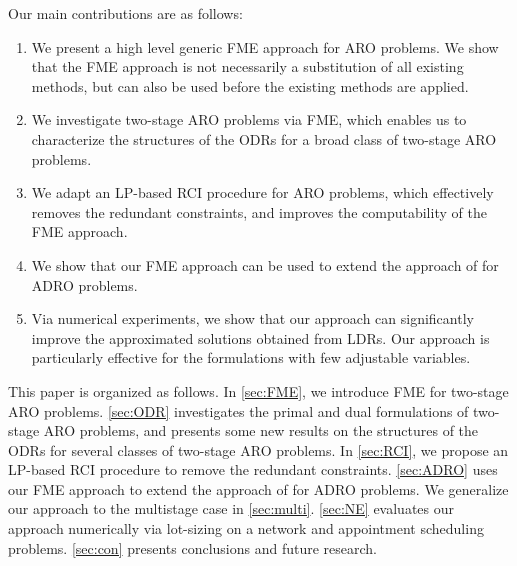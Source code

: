 \documentclass[fleqn,mnsc,blindrev]{informs4}
\begin{document}
	Our main contributions are as follows:
	\begin{enumerate}
		\item  We present a high level generic FME approach for ARO problems.  {We show that the FME approach is not necessarily a substitution of all existing methods, but can also be used before the existing methods are applied.}
		\item  We investigate two-stage ARO problems via FME, which enables us to characterize the structures of the ODRs for a broad class of two-stage ARO problems. 
		\item  We adapt an LP-based RCI procedure for ARO problems, which effectively removes the redundant constraints, and improves the computability of the FME approach.
		\item  We show that our FME approach can be used to extend the approach of \cite{bsz17} for ADRO problems. 
		\item Via numerical experiments, we show that our approach can significantly improve the  {approximated solutions obtained from LDRs}. Our approach is particularly effective for the formulations with few adjustable variables.
	\end{enumerate}
	
	This paper is organized as follows. In \textsection \ref{sec:FME}, we introduce FME for two-stage ARO problems. \textsection \ref{sec:ODR} investigates the primal and dual formulations of two-stage ARO problems, and presents some new results on the structures of the ODRs for several classes of two-stage ARO problems. In \textsection \ref{sec:RCI}, we propose an LP-based RCI procedure to remove the redundant constraints.  \textsection \ref{sec:ADRO} uses our FME approach to extend the approach of \cite{bsz17} for ADRO problems. We generalize our approach to the multistage case in \textsection \ref{sec:multi}. \textsection \ref{sec:NE} evaluates our approach numerically via lot-sizing on a network and appointment scheduling problems. \textsection \ref{sec:con} presents conclusions and future research.
	
\end{document}
